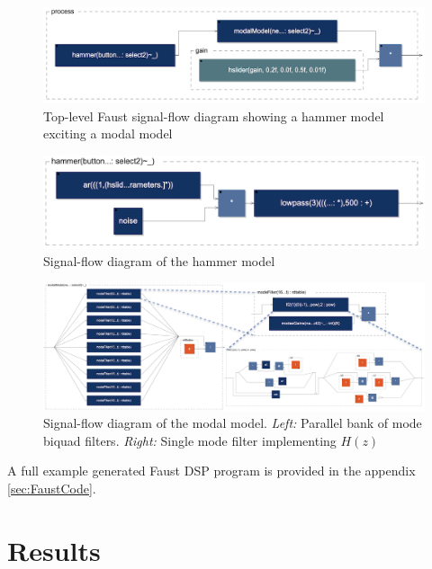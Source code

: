 \documentclass[12pt]{article}
\begin{document}
\begin{figure}
  \centering
  \includegraphics[width=\linewidth]{images/FaustProcess.png}
  \caption{Top-level Faust signal-flow diagram showing a hammer model exciting a modal model}
  \label{fig:FaustProcess}
\end{figure}
\begin{figure}
  \centering
  \includegraphics[width=\linewidth]{images/FaustHammer.png}
  \caption{Signal-flow diagram of the hammer model}
  \label{fig:FaustHammer}
\end{figure}
\begin{figure}
  \centering
  \includegraphics[width=\linewidth]{images/FaustModeDiagrams.png}
  \caption{Signal-flow diagram of the modal model. \textit{Left:} Parallel bank of mode biquad filters. \textit{Right:} Single mode filter implementing $H(z)$}
  \label{fig:FaustModeDiagrams}
\end{figure}

A full example generated Faust DSP program is provided in the appendix \ref{sec:FaustCode}.

\section{Results}
\end{document}
